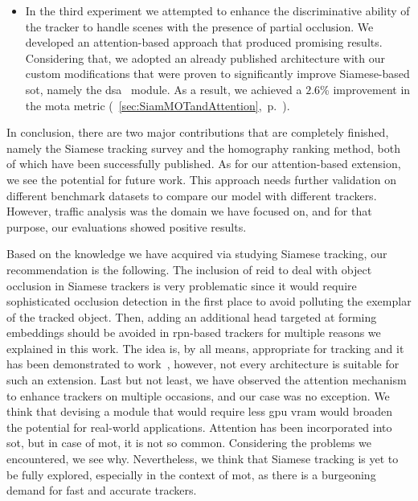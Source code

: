 \begin{enumerate}
\begin{itemize}
              \item In the third experiment we attempted to enhance the discriminative ability of the tracker to handle scenes with the presence of partial occlusion. We developed an attention-based approach that produced promising results. Considering that, we adopted an already published architecture with our custom modifications that were proven to significantly improve Siamese-based \gls{sot}, namely the \gls{dsa}~\cite{yu2021dsa} module. As a result, we achieved a $2.6$\% improvement in the \gls{mota} metric (\sectiontext{}~\ref{sec:SiamMOTandAttention},~p.~\pageref{sec:SiamMOTandAttention}).
          \end{itemize}
\end{enumerate}

In conclusion, there are two major contributions that are completely finished, namely the Siamese tracking survey and the homography ranking method, both of which have been successfully published. As for our attention-based extension, we see the potential for future work. This approach needs further validation on different benchmark datasets to compare our model with different trackers. However, traffic analysis was the domain we have focused on, and for that purpose, our evaluations showed positive results.

Based on the knowledge we have acquired via studying Siamese tracking, our recommendation is the following. The inclusion of \gls{reid} to deal with object occlusion in Siamese trackers is very problematic since it would require sophisticated occlusion detection in the first place to avoid polluting the exemplar of the tracked object. Then, adding an additional head targeted at forming embeddings should be avoided in \gls{rpn}-based trackers for multiple reasons we explained in this work. The idea is, by all means, appropriate for tracking and it has been demonstrated to work~\cite{lu2020retinatrack, zhang2021fairmot}, however, not every architecture is suitable for such an extension. Last but not least, we have observed the attention mechanism to enhance trackers on multiple occasions, and our case was no exception. We think that devising a module that would require less \gls{gpu} \gls{vram} would broaden the potential for real-world applications. Attention has been incorporated into \gls{sot}, but in case of \gls{mot}, it is not so common. Considering the problems we encountered, we see why. Nevertheless, we think that Siamese tracking is yet to be fully explored, especially in the context of \gls{mot}, as there is a burgeoning demand for fast and accurate trackers.